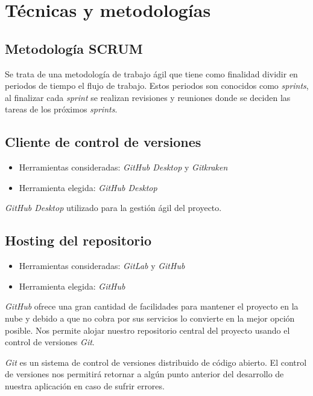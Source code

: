 
\section{Técnicas y metodologías}

\subsection{Metodología SCRUM}
Se trata de una metodología de trabajo ágil que tiene como finalidad dividir en periodos de tiempo el flujo de trabajo. Estos periodos son conocidos como  \textit{sprints}, al finalizar cada \textit{sprint} se realizan revisiones y reuniones donde se deciden las tareas de los próximos \textit{sprints}.

\subsection{Cliente de control de versiones}
\begin{itemize}
\item Herramientas consideradas: \textit{GitHub Desktop} y \textit{Gitkraken}
\item Herramienta elegida: \textit{GitHub Desktop}
\end{itemize}

\textit{GitHub Desktop} utilizado para la gestión ágil del proyecto.

\subsection{Hosting del repositorio}
\begin{itemize}
\item Herramientas consideradas: \textit{GitLab} y \textit{GitHub}
\item Herramienta elegida: \textit{GitHub}
\end{itemize}

\textit{GitHub} ofrece una gran cantidad de facilidades para mantener el proyecto en la nube y debido a que no cobra por sus servicios lo convierte en la mejor opción posible. Nos permite alojar nuestro repositorio central del proyecto usando el control de versiones \textit{Git}.

\textit{Git} es un sistema de control de versiones distribuido de código abierto. El control de versiones nos permitirá retornar a algún punto anterior del desarrollo de nuestra aplicación en caso de sufrir errores.


